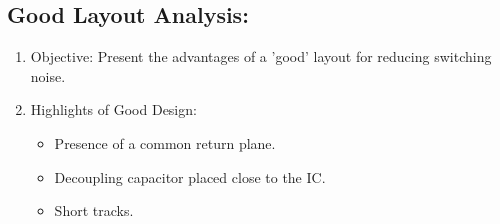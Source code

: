 \documentclass[a4paper,11pt]{article}%
\begin{document}
\subsection{Good Layout Analysis:}
\begin{enumerate}
	\item Objective: Present the advantages of a 'good' layout for reducing switching noise.
	\item Highlights of Good Design:
	\begin{itemize}
		\item Presence of a common return plane.
		\item Decoupling capacitor placed close to the IC.
		\item Short tracks.
	\end{itemize}
	
\end{enumerate}
\end{document}
